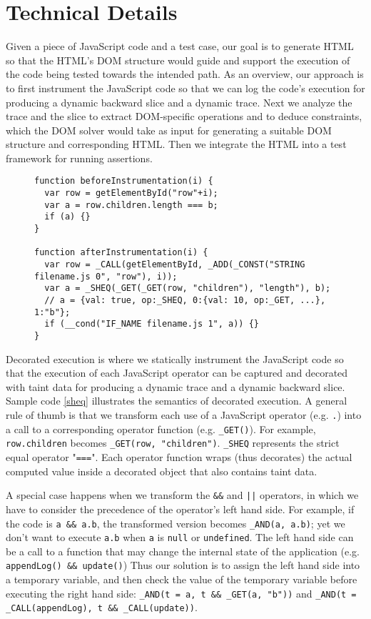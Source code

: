 \section{Technical Details}
Given a piece of JavaScript code and a test case, our goal is to generate HTML so that the HTML's DOM structure would guide and support the execution of the code being tested towards the intended path.  
As an overview, our approach is to first instrument the JavaScript code so that we can log the code's execution for producing a dynamic backward slice and a dynamic trace.  
Next we analyze the trace and the slice to extract DOM-specific operations and to deduce constraints, which the DOM solver would take as input for generating a suitable DOM structure and corresponding HTML.  
Then we integrate the HTML into a test framework for running assertions.  

\begin{figure}
\begin{lstlisting}[caption=Example showing how code is instrumented for dynamic analysis.,label=sheq]  
function beforeInstrumentation(i) {
  var row = getElementById("row"+i);
  var a = row.children.length === b; 
  if (a) {}
}

function afterInstrumentation(i) {
  var row = _CALL(getElementById, _ADD(_CONST("STRING filename.js 0", "row"), i));
  var a = _SHEQ(_GET(_GET(row, "children"), "length"), b);
  // a = {val: true, op:_SHEQ, 0:{val: 10, op:_GET, ...}, 1:"b"};
  if (__cond("IF_NAME filename.js 1", a)) {}
}

\end{lstlisting}
\end{figure}

Decorated execution is where we statically instrument the JavaScript code so that the execution of each JavaScript operator can be captured and decorated with taint data for producing a dynamic trace and a dynamic backward slice.  Sample code \ref{sheq} illustrates the semantics of decorated execution.  
A general rule of thumb is that we transform each use of a JavaScript operator (e.g. {\tt .}) into a call to a corresponding operator function (e.g. {\tt \_GET()}).  For example, {\tt row.children} becomes {\tt \_GET(row, "children")}.  {\tt \_SHEQ} represents the strict equal operator "{\tt ===}".  
Each operator function wraps (thus decorates) the actual computed value inside a decorated object that also contains taint data.   

A special case happens when we transform the {\tt \&\&} and {\tt |}{\tt |} operators, in which we have to consider the precedence of the operator's left hand side.   
For example, if the code is {\tt a \&\& a.b}, the transformed version becomes {\tt \_AND(a, a.b)}; yet we don't want to execute {\tt a.b} when {\tt a} is {\tt null} or {\tt undefined}.  
The left hand side can be a call to a function that may change the internal state of the application (e.g. {\tt appendLog() \&\& update()})
Thus our solution is to assign the left hand side into a temporary variable, and then check the value of the temporary variable before executing the right hand side: {\tt \_AND(t = a, t \&\& \_GET(a, "b"))} and {\tt \_AND(t = \_CALL(appendLog), t \&\& \_CALL(update))}.  

